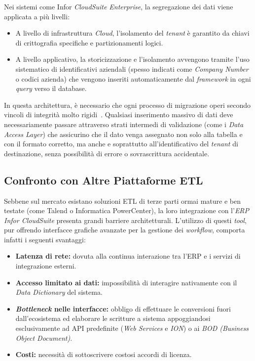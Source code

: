 Nei sistemi come Infor \textit{CloudSuite Enterprise}, la segregazione dei dati viene applicata a più livelli:
\begin{itemize}
    \item A livello di infrastruttura \textit{Cloud}, l'isolamento del \textit{tenant} è garantito da chiavi di crittografia specifiche e partizionamenti logici.
    \item A livello applicativo, la storicizzazione e l'isolamento avvengono tramite l'uso sistematico di identificativi aziendali
    (spesso indicati come \textit{Company Number} o codici azienda) che vengono inseriti automaticamente dal \textit{framework} in ogni \textit{query} verso il database.
\end{itemize}

In questa architettura, è necessario che ogni processo di migrazione operi secondo vincoli di integrità molto rigidi~\cite{dataMigrationStrategies}.
Qualsiasi inserimento massivo di dati deve necessariamente passare attraverso strati intermedi di validazione (come i \textit{Data Access Layer})
che assicurino che il dato venga assegnato non solo alla tabella e con il formato corretto, ma anche e soprattutto all'identificativo del \textit{tenant}
di destinazione, senza possibilità di errore o sovrascrittura accidentale.

\subsection{Confronto con Altre Piattaforme ETL}\label{subsec:confronto-con-altre-piattaforme-etl}

Sebbene sul mercato esistano soluzioni ETL di terze parti ormai mature e ben testate (come Talend o Informatica PowerCenter),
la loro integrazione con l'\textit{ERP Infor CloudSuite} presenta grandi barriere architetturali.
L'utilizzo di questi \textit{tool}, pur offrendo interfacce grafiche avanzate per la gestione dei \textit{workflow},
comporta infatti i seguenti svantaggi:
\begin{itemize}
    \item \textbf{Latenza di rete:} dovuta alla continua interazione tra l'ERP e i servizi di integrazione esterni.
    \item \textbf{Accesso limitato ai dati:} impossibilità di interagire nativamente con il \textit{Data Dictionary} del sistema.
    \item \textbf{\textit{Bottleneck} nelle interfacce:} obbligo di effettuare le conversioni fuori dall'ecosistema ed elaborare
    le scritture a sistema appoggiandosi esclusivamente ad API predefinite (\textit{Web Services} e \textit{ION}) o ai \textit{BOD (Business Object Document)}.
    \item \textbf{Costi:} necessità di sottoscrivere costosi accordi di licenza.
\end{itemize}

